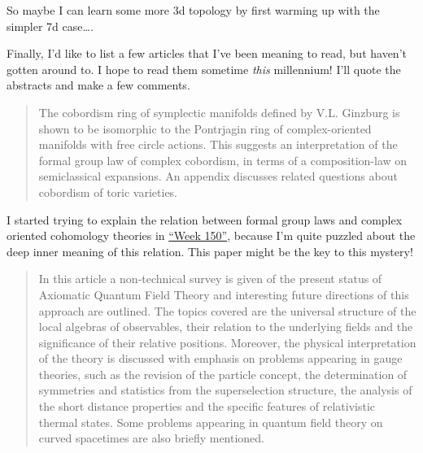\documentclass{article}
\def\tightlist{}
\renewcommand{\texttt}[1]{%
  \begingroup
  \ttfamily
  \begingroup\lccode`~=`/\lowercase{\endgroup\def~}{/\discretionary{}{}{}}%
  \begingroup\lccode`~=`[\lowercase{\endgroup\def~}{[\discretionary{}{}{}}%
  \begingroup\lccode`~=`.\lowercase{\endgroup\def~}{.\discretionary{}{}{}}%
  \catcode`/=\active\catcode`[=\active\catcode`.=\active
  \scantokens{#1\noexpand}%
  \endgroup
}
\begin{document}
So maybe I can learn some more 3d topology by first warming up with the
simpler 7d case\ldots.

Finally, I'd like to list a few articles that I've been meaning to read,
but haven't gotten around to. I hope to read them sometime \emph{this}
millennium! I'll quote the abstracts and make a few comments.


\begin{quote}
The cobordism ring of symplectic manifolds defined by V.L. Ginzburg is
shown to be isomorphic to the Pontrjagin ring of complex-oriented
manifolds with free circle actions. This suggests an interpretation of
the formal group law of complex cobordism, in terms of a composition-law
on semiclassical expansions. An appendix discusses related questions
about cobordism of toric varieties.
\end{quote}

I started trying to explain the relation between formal group laws and
complex oriented cohomology theories in
\protect\hyperlink{week150}{``Week 150''}, because I'm quite puzzled
about the deep inner meaning of this relation. This paper might be the
key to this mystery!


\begin{quote}
In this article a non-technical survey is given of the present status of
Axiomatic Quantum Field Theory and interesting future directions of this
approach are outlined. The topics covered are the universal structure of
the local algebras of observables, their relation to the underlying
fields and the significance of their relative positions. Moreover, the
physical interpretation of the theory is discussed with emphasis on
problems appearing in gauge theories, such as the revision of the
particle concept, the determination of symmetries and statistics from
the superselection structure, the analysis of the short distance
properties and the specific features of relativistic thermal states.
Some problems appearing in quantum field theory on curved spacetimes are
also briefly mentioned.
\end{quote}
\end{document}
